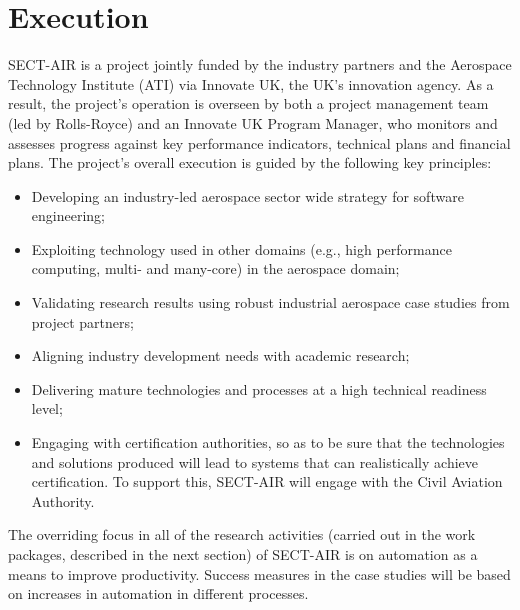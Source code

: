 \section{Execution}
\label{sec:execution}

SECT-AIR is a project jointly funded by the industry partners and the Aerospace Technology Institute (ATI) via Innovate UK, the UK's innovation agency. As a result, the project's operation is overseen by both a project management team (led by Rolls-Royce) and an Innovate UK Program Manager, who monitors and assesses progress against key performance indicators, technical plans and financial plans. The project's overall execution is guided by the following key principles:
\begin{itemize}
\item Developing an industry-led aerospace sector wide strategy for software engineering;
\item Exploiting technology used in other domains (e.g., high performance computing, multi- and many-core) in the aerospace domain;
\item Validating research results using robust industrial aerospace case studies from project partners;
\item Aligning industry development needs with academic research;
\item Delivering mature technologies and processes at a high technical readiness level;
\item Engaging with certification authorities, so as to be sure that the technologies and solutions produced will lead to systems that can realistically achieve certification. To support this, SECT-AIR will engage with the Civil Aviation Authority.
\end{itemize}
The overriding focus in all of the research activities  (carried out in the work packages, described in the next section) of SECT-AIR is on automation as a means to improve productivity. Success measures in the case studies will be based on increases in automation in different processes.




